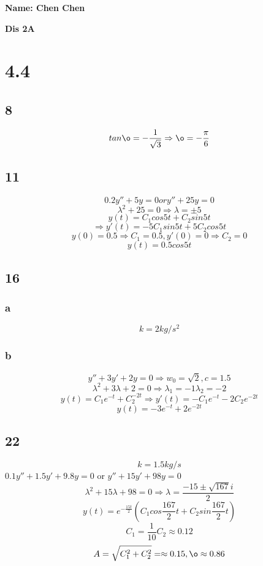 \documentclass[12pt, a4paper]{IEEEtran}
\begin{document}
    \centerline{\textbf{Name: Chen Chen}}
    
    \centerline{\textbf{Dis 2A}}

    \section*{4.4}
    
    \subsection*{8}
    \vspace{6cm}
    $$tan \o =-\frac{1}{\sqrt{3}}\Rightarrow \o=-\frac{\pi}{6}$$
    
    \subsection*{11}
    $$0.2y''+5y=0 or y''+25y=0$$
    $$\lambda^2+25=0\Rightarrow \lambda=\pm 5$$
    $$y(t)=C_1cos5t+C_2sin5t$$
    $$\Rightarrow y'(t)=-5C_1sin5t+5C_2cos5t$$
    $$y(0)=0.5\Rightarrow C_1=0.5, y'(0)=0\Rightarrow C_2=0$$
    $$y(t)=0.5cos5t$$
    \vspace{6cm}

    \subsection*{16}
    \subsubsection*{a}
    $$k=2kg/s^2$$
    \subsubsection*{b}
    $$y''+3y'+2y=0\Rightarrow w_0=\sqrt{2}, c=1.5$$
    $$\lambda^2+3\lambda+2=0\Rightarrow \lambda_1=-1 \lambda_2=-2$$
    $$y(t)=C_1e^{-t}+C_2^{-2t}\Rightarrow y'(t)=-C_1e^{-t}-2C_2e^{-2t}$$
    $$y(t)=-3e^{-t}+2e^{-2t}$$
    \vspace{6cm}

    \subsection*{22}
    $$k=1.5kg/s$$
    $0.1y''+1.5y'+9.8y=0$ or $y''+15y'+98y=0$
    $$\lambda^2+15\lambda+98=0\Rightarrow \lambda=\frac{-15\pm\sqrt{167}i}{2}$$
    $$y(t)=e^{-\frac{15t}{2}}(C_1cos\frac{167}{2}t+C_2sin\frac{167}{2}t)$$
    $$C_1=\frac{1}{10} C_2\approx 0.12$$
    $$A=\sqrt{C_1^2+C_2^2}=\approx 0.15, \o \approx 0.86$$
    \vspace{6cm}
\end{document}
